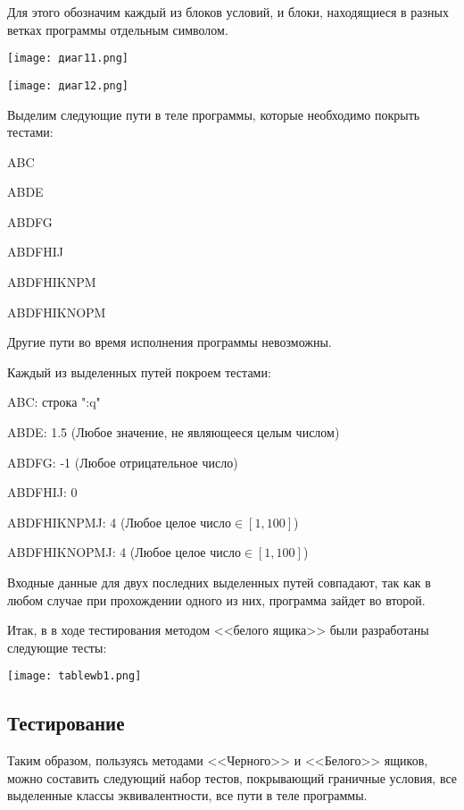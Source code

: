 \documentclass[12pt]{article}
\begin{document}
Для этого обозначим каждый из блоков условий, и блоки, находящиеся в разных ветках программы отдельным символом.



\vskip 1cm
{
    \centering
    \texttt{[image: диаг11.png]}
   
    \label{fig:i1}
}
\vskip 1cm

\vskip 1cm
{
    \centering
    \texttt{[image: диаг12.png]}
   
    \label{fig:i1}
}
\vskip 1cm




Выделим следующие пути в теле программы, которые необходимо покрыть тестами:

ABC

ABDE

ABDFG

ABDFHIJ

ABDFHIKNPM

ABDFHIKNOPM

Другие пути во время исполнения программы невозможны.

Каждый из выделенных путей покроем тестами:

ABC:  строка ":q"

ABDE:   1.5 (Любое значение, не являющееся целым числом)

ABDFG:    -1 (Любое отрицательное число)

ABDFHIJ:   0

ABDFHIKNPMJ: 4 (Любое целое число$\in [1,100]$)

ABDFHIKNOPMJ:  4 (Любое целое число$\in [1,100]$)

Входные данные для двух последних выделенных путей совпадают, так как в любом случае при прохождении одного из них, программа зайдет во второй.



Итак, в в ходе тестирования методом <<белого ящика>> были разработаны следующие тесты:


\vskip 1cm
{
    \centering
    \texttt{[image: tablewb1.png]}
   
    \label{fig:i1}
}
\vskip 1cm

\subsection{Тестирование}


Таким образом, пользуясь методами <<Черного>> и <<Белого>>
ящиков, можно составить следующий набор тестов, покрывающий граничные условия, все выделенные классы эквивалентности, все пути в теле программы.
\end{document}
